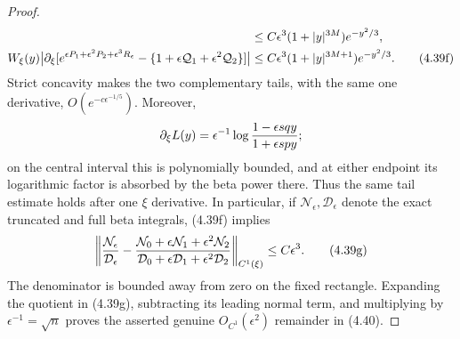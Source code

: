 \documentclass[11pt,a4paper]{article}
\numberwithin{equation}{section}
\theoremstyle{definition}
\theoremstyle{remark}
\begin{document}
\begin{proof}
\begin{align}
 &\le C\epsilon^3(1+|y|^{3M})e^{-y^2/3},\notag\\
 W_\xi(y)\big|\partial_\xi
  [e^{\epsilon P_1+\epsilon^2P_2+\epsilon^3R_\epsilon}
       -\{1+\epsilon\mathcal Q_1+\epsilon^2\mathcal Q_2\}]\big|
 &\le C\epsilon^3(1+|y|^{3M+1})e^{-y^2/3}.            \tag{4.39f}
\end{align}
Strict concavity makes the two complementary tails, with the same one
derivative, $O(e^{-c\epsilon^{-1/5}})$.  Moreover,
\[
 \partial_\xi L(y)=\epsilon^{-1}
 \log{1-\epsilon sqy\over1+\epsilon spy};
\]
on the central interval this is polynomially bounded, and at either
endpoint its logarithmic factor is absorbed by the beta power there.
Thus the same tail estimate holds after one $\xi$ derivative.  In
particular, if $\mathcal N_\epsilon,\mathcal D_\epsilon$ denote the exact
truncated and full beta integrals, (4.39f) implies
\[
 \left\|{\mathcal N_\epsilon\over\mathcal D_\epsilon}
 -{\mathcal N_0+\epsilon\mathcal N_1+\epsilon^2\mathcal N_2
       \over
    \mathcal D_0+\epsilon\mathcal D_1+\epsilon^2\mathcal D_2}
 \right\|_{C^1(\xi)}\le C\epsilon^3.                  \tag{4.39g}
\]
The denominator is bounded away from zero on the fixed rectangle.
Expanding the quotient in (4.39g), subtracting its leading normal term,
and multiplying by $\epsilon^{-1}=\sqrt n$ proves the asserted genuine
$O_{C^1}(\epsilon^2)$ remainder in (4.40).


\end{proof}
\end{document}
